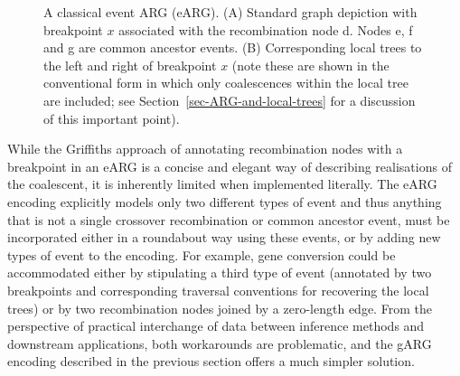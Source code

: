 \documentclass{article}
\newcommand{\noderef}[1]{\textsf{#1}}
\begin{document}
\begin{figure}
\caption{\label{fig-event-arg}
A classical event ARG (eARG). (A) Standard graph depiction with
breakpoint $x$ associated with the recombination node \noderef{d}.
Nodes \noderef{e}, \noderef{f} and \noderef{g} are common ancestor events.
(B) Corresponding local trees to the left and right of breakpoint $x$
(note these are shown in the conventional form in which only coalescences
within the local tree are included; see Section~\ref{sec-ARG-and-local-trees}
for a discussion of this important point).
}
\end{figure}

While the Griffiths approach of annotating recombination nodes with a
breakpoint in an eARG is a concise and elegant way of describing realisations
of the coalescent, it is inherently limited when
implemented literally. The eARG encoding explicitly models only
two different types of event and thus anything that is not a single crossover
recombination or common ancestor event, must be incorporated
either in a roundabout way using these
events, or by adding new types of event to the encoding. For example, gene
conversion could be accommodated either by stipulating a third type of event
(annotated by two breakpoints and corresponding traversal conventions for
recovering the local trees) or by two recombination nodes joined by a
zero-length edge. From the perspective of practical interchange of data between
inference methods and downstream applications, both
workarounds are problematic, and the gARG encoding described in the previous
section offers a much simpler solution.
\end{document}
